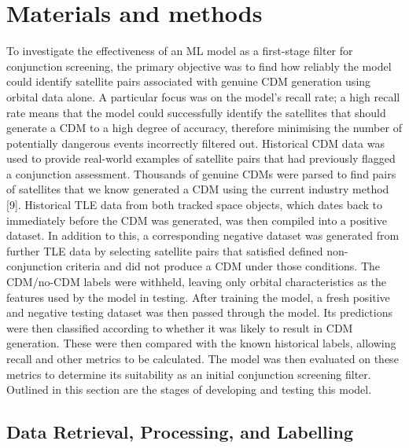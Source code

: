 \documentclass[letterpaper,11pt,leqno]{article}
\begin{document}
\section{Materials and methods}\label{s:methods}

To investigate the effectiveness of an ML model as a first-stage filter for conjunction screening, the primary objective was to find how reliably the model could identify satellite pairs associated with genuine CDM generation using orbital data alone. A particular focus was on the model’s recall rate; a high recall rate means that the model could successfully identify the satellites that should generate a CDM to a high degree of accuracy, therefore minimising the number of potentially dangerous events incorrectly filtered out. 
Historical CDM data was used to provide real-world examples of satellite pairs that had previously flagged a conjunction assessment. Thousands of genuine CDMs were parsed to find pairs of satellites that we know generated a CDM using the current industry method [9]. Historical TLE data from both tracked space objects, which dates back to immediately before the CDM was generated, was then compiled into a positive dataset. In addition to this, a corresponding negative dataset was generated from further TLE data by selecting satellite pairs that satisfied defined non-conjunction criteria and did not produce a CDM under those conditions.
The CDM/no-CDM labels were withheld, leaving only orbital characteristics as the features used by the model in testing. After training the model, a fresh positive and negative testing dataset was then passed through the model. Its predictions were then classified according to whether it was likely to result in CDM generation. These were then compared with the known historical labels, allowing recall and other metrics to be calculated. The model was then evaluated on these metrics to determine its suitability as an initial conjunction screening filter. Outlined in this section are the stages of developing and testing this model.

\subsection{Data Retrieval, Processing, and Labelling}
\end{document}
